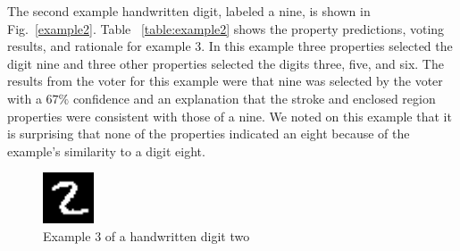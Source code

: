 \documentclass[conference]{IEEEtran}
\begin{document}
The second example handwritten digit,  labeled a nine, is shown in Fig.~\ref{example2}.  Table ~\ref{table:example2} shows the property predictions, voting results, and rationale for example 3.  In this example three properties selected the digit nine and three other properties selected the digits three, five, and six.  The results from the voter for this example were that nine was selected by the voter with a $67\%$ confidence and an explanation that the stroke and enclosed region properties were consistent with those of a nine.  We noted on this example that it is surprising that none of the properties indicated an eight because of the example's similarity to a digit eight.  

 \begin{figure}[htbp]
\centerline{\includegraphics[width=15mm]{./digit-images/2-4.png}}
\caption{Example 3 of a handwritten digit two}
\label{example3}
\end{figure}

\end{document}
